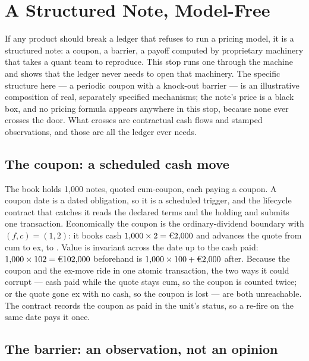 \section{A Structured Note, Model-Free}\label{sec:tour-note}

If any product should break a ledger that refuses to run a pricing model, it is a
structured note: a coupon, a barrier, a payoff computed by proprietary machinery that
takes a quant team to reproduce. This stop runs one through the machine and shows that
the ledger never needs to open that machinery. The specific structure here --- a
periodic coupon with a knock-out barrier --- is an illustrative composition of real,
separately specified mechanisms; the note's price is a black box, and no pricing
formula appears anywhere in this stop, because none ever crosses the door. What crosses
are contractual cash flows and stamped observations, and those are all the ledger ever
needs.

\subsection{The coupon: a scheduled cash move}

The book holds 1{,}000 notes, quoted  cum-coupon, each paying a 
coupon. A coupon date is a dated obligation, so it is a scheduled trigger, and the
lifecycle contract that catches it reads the declared terms and the holding and
submits one transaction. Economically the coupon is the ordinary-dividend boundary
with $(f, c) = (1, 2)$: it books cash $1{,}000 \times 2 = \EUR{2{,}000}$ and advances
the quote from cum to ex,  to . Value is invariant across the date
up to the cash paid: $1{,}000 \times 102 = \EUR{102{,}000}$ beforehand is
$1{,}000 \times 100 + \EUR{2{,}000}$ after. Because the coupon and the ex-move ride in
one atomic transaction, the two ways it could corrupt --- cash paid while the quote
stays cum, so the coupon is counted twice; or the quote gone ex with no cash, so the
coupon is lost --- are both unreachable. The contract records the coupon as paid in the
unit's status, so a re-fire on the same date pays it once.

\subsection{The barrier: an observation, not an opinion}


